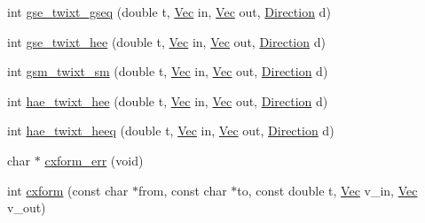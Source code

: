 \begin{DoxyCompactItemize}
int \hyperlink{cxform-auto_8c_a89e7993494058b6615c27adcb6328778}{gse\-\_\-twixt\-\_\-gseq} (double t, \hyperlink{cxform_8h_ae351b761259db318a538251033f3cb27}{Vec} in, \hyperlink{cxform_8h_ae351b761259db318a538251033f3cb27}{Vec} out, \hyperlink{cxform_8h_abc151ba67b4c70f0e8dc3fe894264aa1}{Direction} d)
\item 
int \hyperlink{cxform-auto_8c_a348c8879eb7b149e6519c12224d7008f}{gse\-\_\-twixt\-\_\-hee} (double t, \hyperlink{cxform_8h_ae351b761259db318a538251033f3cb27}{Vec} in, \hyperlink{cxform_8h_ae351b761259db318a538251033f3cb27}{Vec} out, \hyperlink{cxform_8h_abc151ba67b4c70f0e8dc3fe894264aa1}{Direction} d)
\item 
int \hyperlink{cxform-auto_8c_a1eac07a5ce3dd913ae79c948c6e1f742}{gsm\-\_\-twixt\-\_\-sm} (double t, \hyperlink{cxform_8h_ae351b761259db318a538251033f3cb27}{Vec} in, \hyperlink{cxform_8h_ae351b761259db318a538251033f3cb27}{Vec} out, \hyperlink{cxform_8h_abc151ba67b4c70f0e8dc3fe894264aa1}{Direction} d)
\item 
int \hyperlink{cxform-auto_8c_ae3d21e043d5713af6c78d600ba1f0fe0}{hae\-\_\-twixt\-\_\-hee} (double t, \hyperlink{cxform_8h_ae351b761259db318a538251033f3cb27}{Vec} in, \hyperlink{cxform_8h_ae351b761259db318a538251033f3cb27}{Vec} out, \hyperlink{cxform_8h_abc151ba67b4c70f0e8dc3fe894264aa1}{Direction} d)
\item 
int \hyperlink{cxform-auto_8c_ab2bce0f457d0f40436e3d1f05e7d1d86}{hae\-\_\-twixt\-\_\-heeq} (double t, \hyperlink{cxform_8h_ae351b761259db318a538251033f3cb27}{Vec} in, \hyperlink{cxform_8h_ae351b761259db318a538251033f3cb27}{Vec} out, \hyperlink{cxform_8h_abc151ba67b4c70f0e8dc3fe894264aa1}{Direction} d)
\item 
char $\ast$ \hyperlink{cxform-auto_8c_abd49290e1247b54973b115f094ed9b53}{cxform\-\_\-err} (void)
\item 
int \hyperlink{cxform-auto_8c_a9dc415e9f0dae2a4719af4f6c26a9e76}{cxform} (const char $\ast$from, const char $\ast$to, const double t, \hyperlink{cxform_8h_ae351b761259db318a538251033f3cb27}{Vec} v\-\_\-in, \hyperlink{cxform_8h_ae351b761259db318a538251033f3cb27}{Vec} v\-\_\-out)
\end{DoxyCompactItemize}


